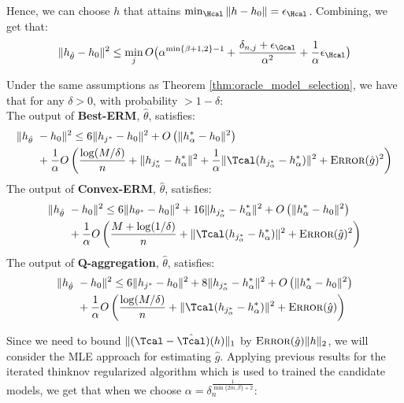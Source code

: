 \documentclass[12pt]{extarticle} %
\newcommand{\error}{\ensuremath{\textsc{Error}}}
\begin{document}
Hence, we can choose $h$ that attains $\min_{\Hcal}\|h-h_0\| = \epsilon_{\Hcal}$. Combining, we get that: 
\begin{align*}
    \|h_{\hat{\theta}} - h_0\|^2 \leq \min_{j}O\big(\alpha^{\min\{\beta+1,2\}-1} + \frac{\delta_{n,j} + \epsilon_\Gcal}{\alpha^2} + \frac{1}{\alpha} \epsilon_{\Hcal}\big)
\end{align*}
\begin{lemma}
    Under the same assumptions as Theorem \ref{thm:oracle_model_selection}, we have that for any $\delta>0$, with probability $>1-\delta$:\\
    The output of \textbf{Best-ERM}, $\hat{\theta}$, satisfies:\\
    \begin{align*}
        \|h_{\hat{\theta}}~&-h_0\|^2 \leq 6 \|h_{j^*}-h_0\|^2 + O\left(\|h_{\alpha}^*-h_0\|^2 \right)\\
        ~&+ \frac{1}{\alpha} O\left(\frac{\log(M/\delta)}{n} + \|h_{j_{\alpha}^*} - h_{\alpha}^*\|^2 +\frac{1}{\alpha} \|\Tcal (h_{j_{\alpha}^*} - h_{\alpha}^*)\|^2 + \error(\hat{g})^2\right)
    \end{align*}
    The output of \textbf{Convex-ERM}, $\hat{\theta}$, satisfies:\\
    \begin{align*}
        \|h_{\hat{\theta}}~&-h_0\|^2 \leq 6 \|h_{\theta^*}-h_0\|^2 +16 \|h_{j_{\alpha}^*} - h_{\alpha}^*\|^2+ O\left(\|h_{\alpha}^*-h_0\|^2 \right)\\
        ~&+ \frac{1}{\alpha} O\left(\frac{M +\log(1/\delta)}{n} + \|\Tcal (h_{j_{\alpha}^*} - h_{\alpha}^*)\|^2 + \error(\hat{g})^2\right)
    \end{align*}
    The output of \textbf{Q-aggregation}, $\hat{\theta}$, satisfies:
        \begin{align*}
        \|h_{\hat{\theta}}~&-h_0\|^2 \leq 6 \|h_{j^*}-h_0\|^2 + 8\|h_{j_{\alpha}^*} - h_{\alpha}^*\|^2  + O\left(\|h_{\alpha}^*-h_0\|^2 \right)\\
        ~&+ \frac{1}{\alpha} O\left(\frac{\log(M/\delta)}{n} + \|\Tcal (h_{j_{\alpha}^*} - h_{\alpha}^*)\|^2 + \error(\hat{g})\right)
    \end{align*}
\end{lemma}
Since we need to bound $\|(\Tcal-\hat{\Tcal})(h)\|_1$ by $\error(\hat{g})\|h\|_2$, we will consider the MLE approach for estimating $\hat{g}$.
Applying previous results for the iterated thinknov regularized algorithm which is used to trained the candidate models, we get that when we choose $\alpha = \delta_n^{\frac{1}{\min\{2m,\beta\} + 2}}$:
\end{document}
